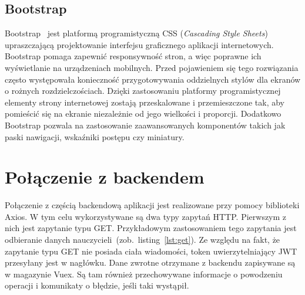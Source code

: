 \subsection{Bootstrap}
Bootstrap~\cite{boot} jest platformą programistyczną CSS (\textit{Cascading Style Sheets}) upraszczającą projektowanie interfejsu graficznego aplikacji internetowych. Bootstrap pomaga zapewnić responsywność stron, a więc poprawne ich wyświetlanie na urządzeniach mobilnych. Przed pojawieniem się tego rozwiązania często występowała konieczność przygotowywania oddzielnych stylów dla ekranów o rożnych rozdzielczościach. Dzięki zastosowaniu platformy programistycznej elementy strony internetowej zostają przeskalowane i przemieszczone tak, aby pomieścić się na ekranie niezależnie od jego wielkości i proporcji. Dodatkowo Bootstrap pozwala na zastosowanie zaawansowanych komponentów takich jak paski nawigacji, wskaźniki postępu czy miniatury. 
\section{Połączenie z backendem}
Połączenie z częścią backendową aplikacji jest realizowane przy pomocy biblioteki Axios. W tym celu wykorzystywane są dwa typy zapytań HTTP. Pierwszym z nich jest zapytanie typu GET. Przykładowym zastosowaniem tego zapytania jest odbieranie danych nauczycieli~(zob.~listing~\ref{lst:get}). Ze względu na fakt, że zapytanie typu GET nie posiada ciała wiadomości, token uwierzytelniający JWT przesyłany jest w nagłówku. Dane zwrotne otrzymane z backendu zapisywane są w magazynie Vuex. Są tam również przechowywane informacje o powodzeniu operacji i komunikaty o błędzie, jeśli taki wystąpił.

